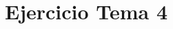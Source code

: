 \documentclass[a4paper]{article}
\title {\fbox{\Huge{\textbf{Ejercicio Tema 4}}}}
\author {\fbox{Ana Buendía Ruiz-Azuaga}}
\begin{document}
\maketitle


\section{Ejercicio Tema 4}

\textbf{}
\end{document}
